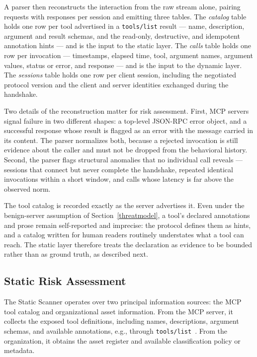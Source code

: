 \documentclass[sigconf]{acmart}
\begin{document}
A parser then reconstructs the interaction from the raw stream alone, pairing
requests with responses per session and emitting three tables. The
\emph{catalog} table holds one row per tool advertised in a \texttt{tools/list}
result --- name, description, argument and result schemas, and the
read-only, destructive, and idempotent annotation hints --- and is the input to
the static layer. The \emph{calls} table holds one row per invocation ---
timestamps, elapsed time, tool, argument names, argument values, status or
error, and response --- and is the input to the dynamic layer. The
\emph{sessions} table holds one row per client session, including the
negotiated protocol version and the client and server identities exchanged
during the handshake.

Two details of the reconstruction matter for risk assessment. First, MCP
servers signal failure in two different shapes: a top-level JSON-RPC error
object, and a successful response whose result is flagged as an error with the
message carried in its content. The parser normalizes both, because a rejected
invocation is still evidence about the caller and must not be dropped from the
behavioral history. Second, the parser flags structural anomalies that no
individual call reveals --- sessions that connect but never complete the
handshake, repeated identical invocations within a short window, and calls
whose latency is far above the observed norm.

The tool catalog is recorded exactly as the server advertises it. Even under
the benign-server assumption of Section~\ref{threatmodel}, a tool's declared
annotations and prose remain self-reported and imprecise: the protocol defines
them as hints, and a catalog written for human readers routinely understates
what a tool can reach. The static layer therefore treats the declaration as
evidence to be bounded rather than as ground truth, as described next.


\subsection{Static Risk Assessment}
\label{sec:static}

The Static Scanner operates over two principal information sources: the MCP
tool catalog and organizational asset information. From the MCP server, it
collects the exposed tool definitions, including names, descriptions, argument
schemas, and available annotations, e.g., through
\texttt{tools/list}~\cite{mcp2026spec}. From the organization, it obtains the
asset register and available classification policy or metadata.
\end{document}
